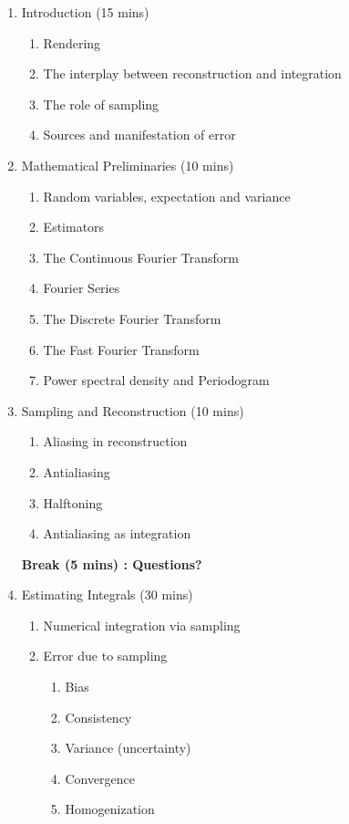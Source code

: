 \begin{enumerate}
	\item Introduction (15 mins)
	\begin{enumerate}
	\itemsep-0.4em	
		\item Rendering
		\item The interplay between reconstruction and integration
		\item The role of sampling
		\item Sources and manifestation of error
	\end{enumerate}
	\item Mathematical Preliminaries (10 mins) 
	\begin{enumerate}
	\itemsep-0.4em	
		\item Random variables, expectation and variance
		\item Estimators
		\item The Continuous Fourier Transform
		\item Fourier Series
		\item The Discrete Fourier Transform
		\item The Fast Fourier Transform
		\item Power spectral density and Periodogram
	\end{enumerate}
	\item Sampling and Reconstruction (10 mins)
	\begin{enumerate}
	\itemsep-0.4em
		\item Aliasing in reconstruction
		\item Antialiasing
		\item Halftoning
		\item Antialiasing as integration
	\end{enumerate}
	\textbf{Break (5 mins) : Questions?}
	\item Estimating Integrals (30 mins) 
	\begin{enumerate}
	\itemsep-0.4em
		\item Numerical integration via sampling
		\item Error due to sampling
		\begin{enumerate}
		\itemsep-0.6em
			\item Bias
			\item Consistency
			\item Variance (uncertainty)
			\item Convergence
			\item Homogenization
		\end{enumerate}

\end{enumerate}
\end{enumerate}
